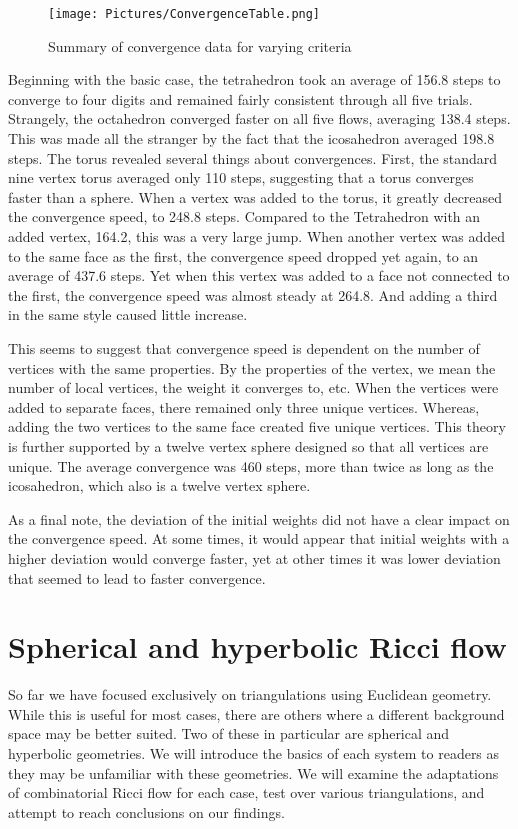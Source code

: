 \documentclass[12pt]{article}
\begin{document}
\begin{figure}
\centering
\texttt{[image: Pictures/ConvergenceTable.png]}
\caption{Summary of convergence data for varying criteria}
\label{fig:conv}
\end{figure}

 Beginning with the basic case, the tetrahedron took an average of 156.8 steps to converge to four digits and remained fairly consistent through all five trials. Strangely, the octahedron converged faster on all five flows, averaging 138.4 steps. This was made all the stranger by the fact that the icosahedron averaged 198.8 steps. The torus revealed several things about convergences. First, the standard nine vertex torus averaged only 110 steps, suggesting that a torus converges faster than a sphere. When a vertex was added to the torus, it greatly decreased the convergence speed, to 248.8 steps. Compared to the Tetrahedron with an added vertex, 164.2, this was a very large jump. When another vertex was added to the same face as the first, the convergence speed dropped yet again, to an average of 437.6 steps. Yet when this vertex was added to a face not connected to the first, the convergence speed was almost steady at 264.8. And adding a third in the same style caused little increase.

 This seems to suggest that convergence speed is dependent on the number of vertices with the same properties. By the properties of the vertex, we mean the number of local vertices, the weight it converges to, etc. When the vertices were added to separate faces, there remained only three unique vertices. Whereas, adding the two vertices to the same face created five unique vertices. This theory is further supported by a twelve vertex sphere designed so that all vertices are unique. The average convergence was 460 steps, more than twice as long as the icosahedron, which also is a twelve vertex sphere.

 As a final note, the deviation of the initial weights did not have a clear impact on the convergence speed. At some times, it would appear that initial weights with a higher deviation would converge faster, yet at other times it was lower deviation that seemed to lead to faster convergence.

\section{Spherical and hyperbolic Ricci flow}
\label{HypSphere}

So far we have focused exclusively on triangulations using Euclidean geometry. While this is useful for most cases, there are others where a different background space may be better suited. Two of these in particular are spherical and hyperbolic geometries. We will introduce the basics of each system to readers as they may be unfamiliar with these geometries. We will examine the adaptations of combinatorial Ricci flow for each case, test over various triangulations, and attempt to reach conclusions on our findings. 
\end{document}

